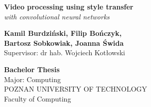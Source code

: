 
\begin{titlepage}
	
	
	\thispagestyle{frontpage}
	
	\begin{center}
		
		\vspace*{6\baselineskip}
	
		
		{\Huge \textbf{Video processing using style transfer \\}}
		\Large{\textit{with convolutional neural networks}}\\
		
        \vspace*{1,5\baselineskip}

		\large{\textbf{Kamil Burdziński, Filip Bończyk, \\Bartosz Sobkowiak, Joanna Świda}}\\
		\vspace{0,5\baselineskip}
		\large{{Supervisor: dr hab. Wojciech Kotłowski }}\\
		
		\vspace{1,5\baselineskip}
		
		\large \textbf{Bachelor Thesis}\\
		\large{Major: Computing}\\
		
		\vspace{1,5\baselineskip}
		\large{POZNAN UNIVERSITY OF TECHNOLOGY}\\
		\large{Faculty of Computing}\\

	\end{center}
	
	\vspace*{4\baselineskip}

	
\end{titlepage}